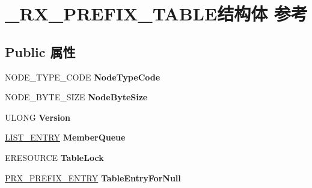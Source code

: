 \hypertarget{struct___r_x___p_r_e_f_i_x___t_a_b_l_e}{}\section{\+\_\+\+R\+X\+\_\+\+P\+R\+E\+F\+I\+X\+\_\+\+T\+A\+B\+L\+E结构体 参考}
\label{struct___r_x___p_r_e_f_i_x___t_a_b_l_e}
\subsection*{Public 属性}
\begin{DoxyCompactItemize}
\item 
\mbox{\label{struct___r_x___p_r_e_f_i_x___t_a_b_l_e_a9ae623f5a8a4976c09cd3da5f779e704}} 
N\+O\+D\+E\+\_\+\+T\+Y\+P\+E\+\_\+\+C\+O\+DE {\bfseries Node\+Type\+Code}
\item 
\mbox{\label{struct___r_x___p_r_e_f_i_x___t_a_b_l_e_af9e87c7f6484409dd57fc50229ded82f}} 
N\+O\+D\+E\+\_\+\+B\+Y\+T\+E\+\_\+\+S\+I\+ZE {\bfseries Node\+Byte\+Size}
\item 
\mbox{\label{struct___r_x___p_r_e_f_i_x___t_a_b_l_e_aa4a1b07385f605984c92d7adee23e690}} 
U\+L\+O\+NG {\bfseries Version}
\item 
\mbox{\label{struct___r_x___p_r_e_f_i_x___t_a_b_l_e_a72a3c055a22bb30e30b5c73136d7dc8d}} 
\hyperlink{struct___l_i_s_t___e_n_t_r_y}{L\+I\+S\+T\+\_\+\+E\+N\+T\+RY} {\bfseries Member\+Queue}
\item 
\mbox{\label{struct___r_x___p_r_e_f_i_x___t_a_b_l_e_af43dbf831f80efa18d70a4f318876743}} 
E\+R\+E\+S\+O\+U\+R\+CE {\bfseries Table\+Lock}
\item 
\mbox{\label{struct___r_x___p_r_e_f_i_x___t_a_b_l_e_a00e8d7bfed604e8fb0c1341df341cc1e}} 
\hyperlink{struct___r_x___p_r_e_f_i_x___e_n_t_r_y}{P\+R\+X\+\_\+\+P\+R\+E\+F\+I\+X\+\_\+\+E\+N\+T\+RY} {\bfseries Table\+Entry\+For\+Null}
\item 
\mbox{\label{struct___r_x___p_r_e_f_i_x___t_a_b_l_e_ac951d08a53eb8286e75669337f595aca}} 

\end{DoxyCompactItemize}
